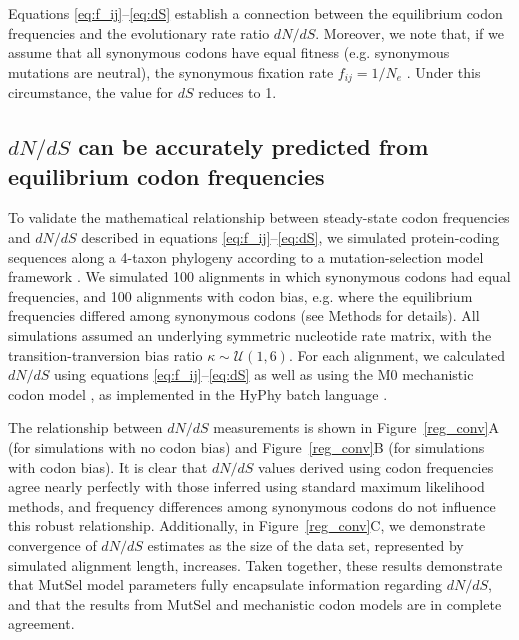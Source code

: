 \documentclass[11pt]{article}
\begin{document}
Equations \eqref{eq:f_ij}--\eqref{eq:dS} establish a connection between the equilibrium codon frequencies and the evolutionary rate ratio $dN/dS$. Moreover, we note that, if we assume that all synonymous codons have equal fitness (e.g. synonymous mutations are neutral), the synonymous fixation rate $f_{ij}= 1/N_e$ \cite{CrowKimura1970}. Under this circumstance, the value for $dS$ reduces to 1.

\subsection*{$dN/dS$ can be accurately predicted from equilibrium codon frequencies}

To validate the mathematical relationship between steady-state codon frequencies and $dN/dS$ described in equations \eqref{eq:f_ij}--\eqref{eq:dS}, we simulated protein-coding sequences along a 4-taxon phylogeny according to a mutation-selection model framework \cite{HalpernBruno1998,SellaHirsh2005}. We simulated 100 alignments in which synonymous codons had equal frequencies, and 100 alignments with codon bias, e.g. where the equilibrium frequencies differed among synonymous codons (see Methods for details). All simulations assumed an underlying symmetric nucleotide rate matrix, with the transition-tranversion bias ratio $\kappa \sim \mathcal{U}(1,6)$. For each alignment, we calculated $dN/dS$ using equations \eqref{eq:f_ij}--\eqref{eq:dS} as well as using the M0 mechanistic codon model \cite{NielsenYang1998}, as implemented in the HyPhy batch language \cite{KosakovskyPondetal2005}.

The relationship between $dN/dS$ measurements is shown in Figure~\ref{reg_conv}A (for simulations with no codon bias) and Figure~\ref{reg_conv}B (for simulations with codon bias). It is clear that $dN/dS$ values derived using codon frequencies agree nearly perfectly with those inferred using standard maximum likelihood methods, and frequency differences among synonymous codons do not influence this robust relationship. Additionally, in Figure~\ref{reg_conv}C, we demonstrate convergence of $dN/dS$ estimates as the size of the data set, represented by simulated alignment length, increases. Taken together, these results demonstrate that MutSel model parameters fully encapsulate information regarding $dN/dS$, and that the results from MutSel and mechanistic codon models are in complete agreement.
\end{document}

